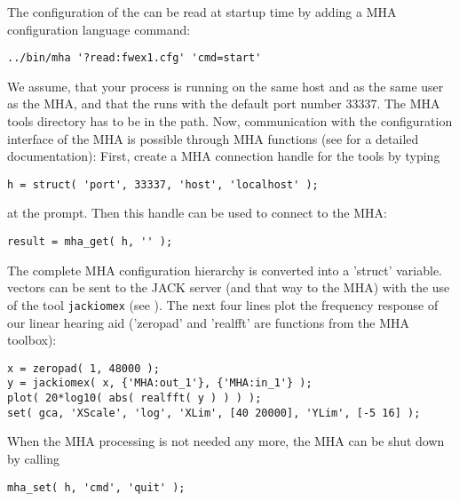 The configuration of the \mhad{} can be
read at startup time by adding a MHA configuration language command:
%
\begin{verbatim}
../bin/mha '?read:fwex1.cfg' 'cmd=start'
\end{verbatim}
%
We assume, that your \Matlab{} process is running on the same host and
as the same user as the MHA, and that the \mhad{} runs with the
default port number 33337.
%
The MHA \Matlab{} tools directory has to be in the \Matlab{} path.
%
Now, communication with the configuration interface of the MHA is
possible through MHA \Matlab{} functions (see 
for a detailed documentation):
%
First, create a MHA connection handle for the \Matlab{} tools by
typing
\begin{verbatim}
h = struct( 'port', 33337, 'host', 'localhost' );
\end{verbatim}
at the \Matlab{} prompt. Then this handle can be used to connect to
the MHA:
%
\begin{verbatim}
result = mha_get( h, '' );
\end{verbatim}
%
The complete MHA configuration hierarchy is converted into a \Matlab{}
'struct' variable.
%
\Matlab{} vectors can be sent to the JACK server (and that way to the
MHA) with the use of the tool \verb!jackiomex! (see
).
%
The next four lines plot the frequency response of our linear hearing
aid ('zeropad' and 'realfft' are functions from the MHA \Matlab{}
toolbox):
\begin{verbatim}
x = zeropad( 1, 48000 );
y = jackiomex( x, {'MHA:out_1'}, {'MHA:in_1'} );
plot( 20*log10( abs( realfft( y ) ) ) );
set( gca, 'XScale', 'log', 'XLim', [40 20000], 'YLim', [-5 16] );
\end{verbatim}
When the MHA processing is not needed any more, the MHA can be shut
down by calling
%
\begin{verbatim}
mha_set( h, 'cmd', 'quit' );
\end{verbatim}



